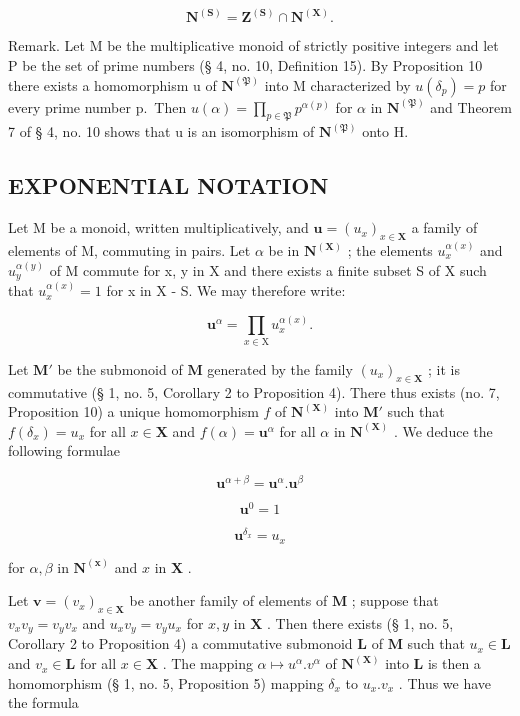 \[
\mathbf {N} ^ {(\mathbf {S})} = \mathbf {Z} ^ {(\mathbf {S})} \cap \mathbf {N} ^ {(\mathbf {X})}.
\]

Remark. Let M be the multiplicative monoid of strictly positive integers and let P be the set of prime numbers (§ 4, no. 10, Definition 15). By Proposition 10 there exists a homomorphism u of \(\mathbf{N}^{(\mathfrak{P})}\) into M characterized by \(u(\delta_{p}) = p\) for every prime number p.~Then \(u(\alpha) = \prod_{p \in \mathfrak{P}} p^{\alpha(p)}\) for \(\alpha\) in \(\mathbf{N}^{(\mathfrak{P})}\) and Theorem 7 of § 4, no. 10 shows that u is an isomorphism of \(\mathbf{N}^{(\mathfrak{P})}\) onto H.

\subsection{EXPONENTIAL NOTATION}

Let M be a monoid, written multiplicatively, and \(\mathbf{u} = (u_{x})_{x \in \mathbf{X}}\) a family of elements of M, commuting in pairs. Let \(\alpha\) be in \(\mathbf{N}^{(\mathbf{X})}\) ; the elements \(u_{x}^{\alpha(x)}\) and \(u_{y}^{\alpha(y)}\) of M commute for x, y in X and there exists a finite subset S of X such that \(u_{x}^{\alpha(x)} = 1\) for x in X - S. We may therefore write:

\[
\mathbf {u} ^ {\alpha} = \prod_ {x \in \mathrm{X}} u _ {x} ^ {\alpha (x)}.\tag{16}
\]

Let \(\mathbf{M}'\) be the submonoid of \(\mathbf{M}\) generated by the family \((u_x)_{x\in \mathbf{X}}\) ; it is commutative (§ 1, no. 5, Corollary 2 to Proposition 4). There thus exists (no. 7, Proposition 10) a unique homomorphism \(f\) of \(\mathbf{N}^{(\mathbf{X})}\) into \(\mathbf{M}'\) such that \(f(\delta_x) = u_x\) for all \(x\in \mathbf{X}\) and \(f(\alpha) = \mathbf{u}^{\alpha}\) for all \(\alpha\) in \(\mathbf{N}^{(\mathbf{X})}\) . We deduce the following formulae

\[
\mathbf {u} ^ {\alpha + \beta} = \mathbf {u} ^ {\alpha}. \mathbf {u} ^ {\beta}\tag{17}
\]

\[
\mathbf {u} ^ {0} = 1\tag{18}
\]

\[
\mathbf {u} ^ {\delta_ {x}} = u _ {x}\tag{19}
\]

for \(\alpha, \beta\) in \(\mathbf{N}^{(\mathbf{x})}\) and \(x\) in \(\mathbf{X}\) .

Let \(\mathbf{v} = (v_x)_{x \in \mathbf{X}}\) be another family of elements of \(\mathbf{M}\) ; suppose that \(v_x v_y = v_y v_x\) and \(u_x v_y = v_y u_x\) for \(x, y\) in \(\mathbf{X}\) . Then there exists (§ 1, no. 5, Corollary 2 to Proposition 4) a commutative submonoid \(\mathbf{L}\) of \(\mathbf{M}\) such that \(u_x \in \mathbf{L}\) and \(v_x \in \mathbf{L}\) for all \(x \in \mathbf{X}\) . The mapping \(\alpha \mapsto u^\alpha . v^\alpha\) of \(\mathbf{N}^{(\mathbf{X})}\) into \(\mathbf{L}\) is then a homomorphism (§ 1, no. 5, Proposition 5) mapping \(\delta_x\) to \(u_x . v_x\) . Thus we have the formula

